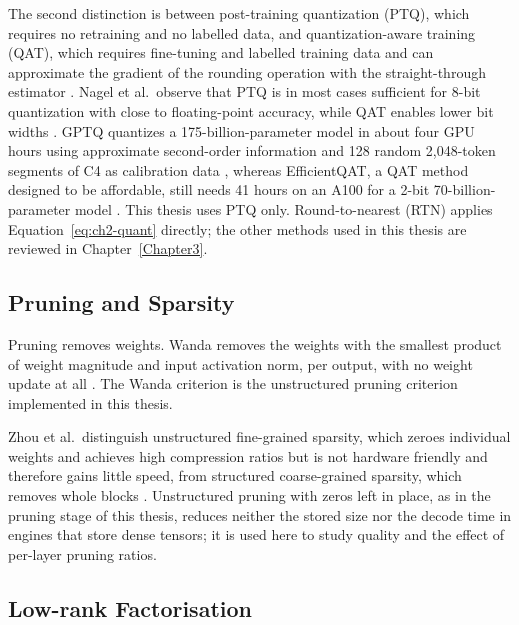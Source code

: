 The second distinction is between post-training quantization (PTQ), which requires no retraining and no labelled data, and quantization-aware training (QAT), which requires fine-tuning and labelled training data and can approximate the gradient of the rounding operation with the straight-through estimator \cite{nagel2021whitepaper}. Nagel et al.\ observe that PTQ is in most cases sufficient for 8-bit quantization with close to floating-point accuracy, while QAT enables lower bit widths \cite{nagel2021whitepaper}. GPTQ quantizes a 175-billion-parameter model in about four GPU hours using approximate second-order information and 128 random 2{,}048-token segments of C4 as calibration data \cite{frantar2023gptq}, whereas EfficientQAT, a QAT method designed to be affordable, still needs 41 hours on an A100 for a 2-bit 70-billion-parameter model \cite{chen2025efficientqat}. This thesis uses PTQ only. Round-to-nearest (RTN) applies Equation~\ref{eq:ch2-quant} directly; the other methods used in this thesis are reviewed in Chapter~\ref{Chapter3}.

\subsection{Pruning and Sparsity}
\label{sec:ch2-pruning}

Pruning removes weights. Wanda removes the weights with the smallest product of weight magnitude and input activation norm, per output, with no weight update at all \cite{sun2024wanda}. The Wanda criterion is the unstructured pruning criterion implemented in this thesis.

Zhou et al.\ distinguish unstructured fine-grained sparsity, which zeroes individual weights and achieves high compression ratios but is not hardware friendly and therefore gains little speed, from structured coarse-grained sparsity, which removes whole blocks \cite{zhou2021nm}. Unstructured pruning with zeros left in place, as in the pruning stage of this thesis, reduces neither the stored size nor the decode time in engines that store dense tensors; it is used here to study quality and the effect of per-layer pruning ratios.

\subsection{Low-rank Factorisation}
\label{sec:ch2-lowrank}

